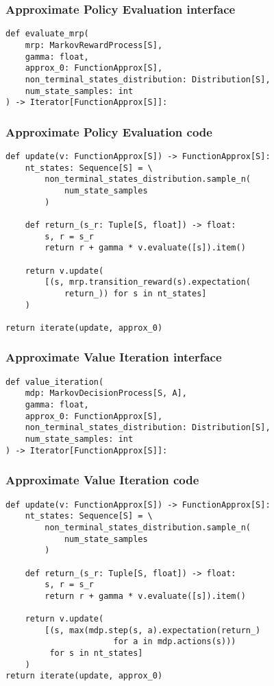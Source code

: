 \documentclass{beamer}
\begin{document}
\begin{frame}[fragile]
\frametitle{Approximate Policy Evaluation interface}
\pause
\begin{lstlisting}
def evaluate_mrp(
    mrp: MarkovRewardProcess[S],
    gamma: float,
    approx_0: FunctionApprox[S],
    non_terminal_states_distribution: Distribution[S],
    num_state_samples: int
) -> Iterator[FunctionApprox[S]]:
\end{lstlisting}
\end{frame}

\begin{frame}[fragile]
\frametitle{Approximate Policy Evaluation code}
\pause
\begin{lstlisting}
def update(v: FunctionApprox[S]) -> FunctionApprox[S]:
    nt_states: Sequence[S] = \
        non_terminal_states_distribution.sample_n(
            num_state_samples
        )

    def return_(s_r: Tuple[S, float]) -> float:
        s, r = s_r
        return r + gamma * v.evaluate([s]).item()

    return v.update(
        [(s, mrp.transition_reward(s).expectation(
            return_)) for s in nt_states]
    )

return iterate(update, approx_0)
\end{lstlisting}
\end{frame}

\begin{frame}[fragile]
\frametitle{Approximate Value Iteration interface}
\pause
\begin{lstlisting}
def value_iteration(
    mdp: MarkovDecisionProcess[S, A],
    gamma: float,
    approx_0: FunctionApprox[S],
    non_terminal_states_distribution: Distribution[S],
    num_state_samples: int
) -> Iterator[FunctionApprox[S]]:
\end{lstlisting}
\end{frame}

\begin{frame}[fragile]
\frametitle{Approximate Value Iteration code}
\pause
\begin{lstlisting}
def update(v: FunctionApprox[S]) -> FunctionApprox[S]:
    nt_states: Sequence[S] = \
        non_terminal_states_distribution.sample_n(
            num_state_samples
        )

    def return_(s_r: Tuple[S, float]) -> float:
        s, r = s_r
        return r + gamma * v.evaluate([s]).item()

    return v.update(
        [(s, max(mdp.step(s, a).expectation(return_)
                      for a in mdp.actions(s)))
         for s in nt_states]
    )
return iterate(update, approx_0)
\end{lstlisting}
\end{frame}
\end{document}
